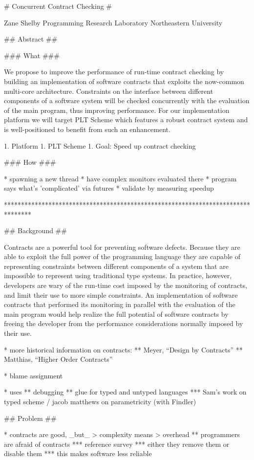 # Concurrent Contract Checking #

Zane Shelby  
Programming Research Laboratory  
Northeastern University  

## Abstract ##

### What ###

We propose to improve the performance of run-time contract checking by
building an implementation of software contracts that exploits the
now-common multi-core architecture. Constraints on the interface
between different components of a software system will be checked
concurrently with the evaluation of the main program, thus improving
performance. For our implementation platform we will target PLT Scheme
which features a robust contract system and is well-positioned to
benefit from such an enhancement.

1. Platform
1. PLT Scheme
1. Goal: Speed up contract checking

### How ###

* spawning a new thread
* have complex monitors evaluated there
* program says what's 'complicated' via futures
* validate by measuring speedup

********************************************************************************

## Background ##

Contracts are a powerful tool for preventing software defects. Because
they are able to exploit the full power of the programming language
they are capable of representing constraints between different
components of a system that are impossible to represent using
traditional type systems. In practice, however, developers are wary of
the run-time cost imposed by the monitoring of contracts, and limit
their use to more simple constraints. An implementation of software
contracts that performed its monitoring in parallel with the
evaluation of the main program would help realize the full potential
of software contracts by freeing the developer from the performance
considerations normally imposed by their use.

* more historical information on contracts:
** Meyer, ``Design by Contracts''
** Matthias, ``Higher Order Contracts''

* blame assignment

* uses
** debugging
** glue for typed and untyped languages
*** Sam's work on typed scheme / jacob matthews on parametricity (with Findler)

## Problem ##

* contracts are good, _but_ > complexity means > overhead
** programmers are afraid of contracts
*** reference survey
*** either they remove them or disable them
*** this makes software less reliable

